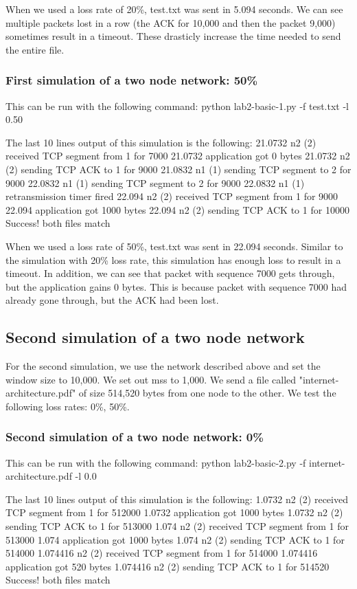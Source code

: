 \documentclass[fleqn,11pt]{article}
\begin{document}
When we used a loss rate of 20\%, test.txt was sent in 5.094 seconds. We can see multiple packets lost in a row (the ACK for 10,000 and then the packet 9,000) sometimes result in a timeout. These drasticly increase the time needed to send the entire file.

\subsubsection{First simulation of a two node network: 50\%}
This can be run with the following command: python lab2-basic-1.py -f test.txt -l 0.50

The last 10 lines output of this simulation is the following:
21.0732 n2 (2) received TCP segment from 1 for 7000
21.0732 application got 0 bytes
21.0732 n2 (2) sending TCP ACK to 1 for 9000
21.0832 n1 (1) sending TCP segment to 2 for 9000
22.0832 n1 (1) sending TCP segment to 2 for 9000
22.0832 n1 (1) retransmission timer fired
22.094 n2 (2) received TCP segment from 1 for 9000
22.094 application got 1000 bytes
22.094 n2 (2) sending TCP ACK to 1 for 10000
Success! both files match

When we used a loss rate of 50\%, test.txt was sent in 22.094 seconds. Similar to the simulation with 20\% loss rate, this simulation has enough loss to result in a timeout. In addition, we can see that packet with sequence 7000 gets through, but the application gains 0 bytes. This is because packet with sequence 7000 had already gone through, but the ACK had been lost. 

 \subsection{Second simulation of a two node network}
For the second simulation, we use the network described above and set the window size to 10,000. We set out mss to 1,000. We send a file called "internet-architecture.pdf" of size 514,520 bytes from one node to the other. We test the following loss rates: 0\%, 50\%.

\subsubsection{Second simulation of a two node network: 0\%}
This can be run with the following command: python lab2-basic-2.py -f internet-architecture.pdf -l 0.0

The last 10 lines output of this simulation is the following:
1.0732 n2 (2) received TCP segment from 1 for 512000
1.0732 application got 1000 bytes
1.0732 n2 (2) sending TCP ACK to 1 for 513000
1.074 n2 (2) received TCP segment from 1 for 513000
1.074 application got 1000 bytes
1.074 n2 (2) sending TCP ACK to 1 for 514000
1.074416 n2 (2) received TCP segment from 1 for 514000
1.074416 application got 520 bytes
1.074416 n2 (2) sending TCP ACK to 1 for 514520
Success! both files match
\end{document}
